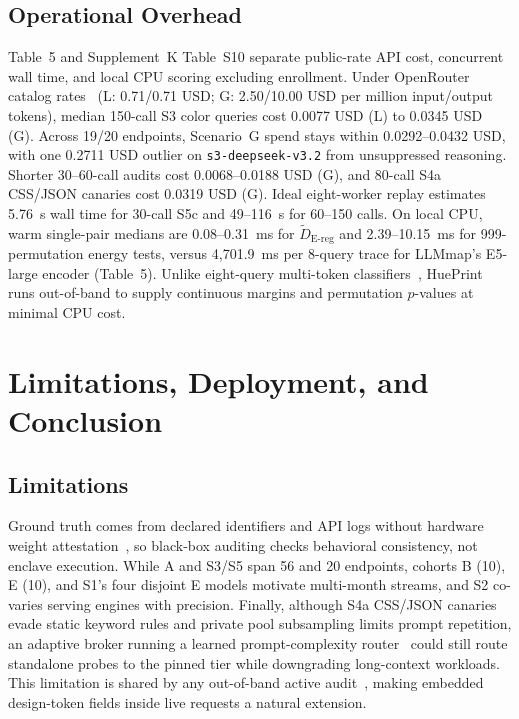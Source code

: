 \documentclass[10pt,journal,compsoc]{IEEEtran}
\newcommand{\Dereg}{\tilde D_{\mathrm{E\mbox{-}reg}}}
\begin{document}
\subsection{Operational Overhead}
Table~5 and Supplement~K Table~S10 separate public-rate API cost, concurrent wall time, and local CPU scoring excluding enrollment. Under OpenRouter catalog rates~\cite{ref30} (L: 0.71/0.71 USD; G: 2.50/10.00 USD per million input/output tokens), median 150-call S3 color queries cost 0.0077 USD (L) to 0.0345 USD (G). Across 19/20 endpoints, Scenario~G spend stays within 0.0292--0.0432 USD, with one 0.2711 USD outlier on \texttt{s3-deepseek-v3.2} from unsuppressed reasoning. Shorter 30--60-call audits cost 0.0068--0.0188 USD (G), and 80-call S4a CSS/JSON canaries cost 0.0319 USD (G). Ideal eight-worker replay estimates 5.76~s wall time for 30-call S5c and 49--116~s for 60--150 calls. On local CPU, warm single-pair medians are 0.08--0.31~ms for $\Dereg{}$ and 2.39--10.15~ms for 999-permutation energy tests, versus 4,701.9~ms per 8-query trace for LLMmap's E5-large encoder (Table~5). Unlike eight-query multi-token classifiers~\cite{ref16}, HuePrint runs out-of-band to supply continuous margins and permutation $p$-values at minimal CPU cost.

\section{Limitations, Deployment, and Conclusion}

\subsection{Limitations}
Ground truth comes from declared identifiers and API logs without hardware weight attestation~\cite{ref5}, so black-box auditing checks behavioral consistency, not enclave execution. While A and S3/S5 span 56 and 20 endpoints, cohorts B (10), E (10), and S1's four disjoint E models motivate multi-month streams, and S2 co-varies serving engines with precision. Finally, although S4a CSS/JSON canaries evade static keyword rules and private pool subsampling limits prompt repetition, an adaptive broker running a learned prompt-complexity router~\cite{ref1,ref2,ref5} could still route standalone probes to the pinned tier while downgrading long-context workloads. This limitation is shared by any out-of-band active audit~\cite{ref4,ref7,ref16}, making embedded design-token fields inside live requests a natural extension.
\end{document}
